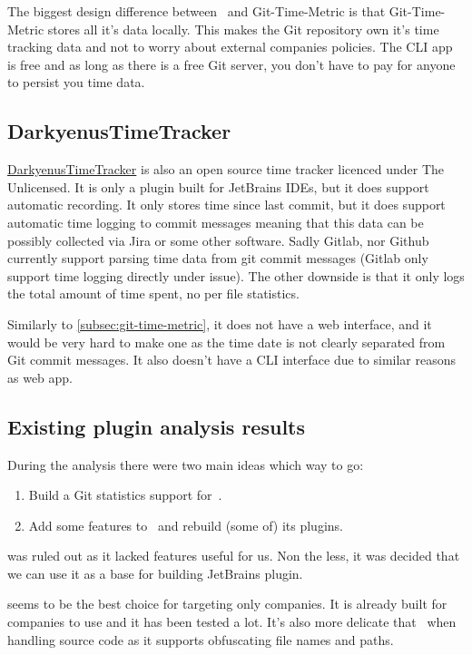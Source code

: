 The biggest design difference between~ and Git-Time-Metric is that Git-Time-Metric stores all it's data locally.
This makes the Git repository own it's time tracking data and not to worry about external companies policies.
The CLI app is free and as long as there is a free Git server, you don't have to pay for anyone to persist you time data.


\subsection{DarkyenusTimeTracker}\label{subsec:darkyenus-time-tracker}
\href{https://github.com/Darkyenus/DarkyenusTimeTracker}{DarkyenusTimeTracker} is also an open source time tracker licenced under The Unlicensed.
It is only a plugin built for JetBrains IDEs, but it does support automatic recording.
It only stores time since last commit, but it does support automatic time logging to commit messages meaning that this data can be possibly collected via Jira or some other software.
Sadly Gitlab, nor Github currently support parsing time data from git commit messages (Gitlab only support time logging directly under issue).
The other downside is that it only logs the total amount of time spent, no per file statistics.

Similarly to
\ref{subsec:git-time-metric}, it does not have a web interface, and it would be very hard to make one as the time date is not clearly separated from Git commit messages.
It also doesn't have a CLI interface due to similar reasons as web app.


\subsection{Existing plugin analysis results}\label{subsec:existing-plugin-analysis-results}
During the analysis there were two main ideas which way to go:
\begin{enumerate}
    \item Build a Git statistics support for~.
    \item Add some features to~ and rebuild (some of) its plugins.
\end{enumerate}

 was ruled out as it lacked features useful for us.
Non the less, it was decided that we can use it as a base for building JetBrains plugin.

 seems to be the best choice for targeting only companies.
It is already built for companies to use and it has been tested a lot.
It's also more delicate that~ when handling source code as it supports obfuscating file names and paths.

